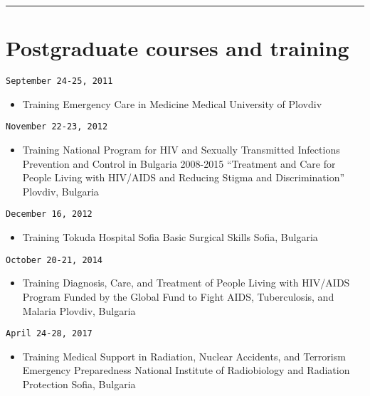 \documentclass[
  12pt,
  letterpaper,
  DIV=11,
  numbers=noendperiod]{scrartcl}
\providecommand{\tightlist}{%
  \setlength{\itemsep}{0pt}\setlength{\parskip}{0pt}}\usepackage{longtable,booktabs,array}
\begin{document}
\begin{center}\rule{0.5\linewidth}{0.5pt}\end{center}

\section{Postgraduate courses and
training}\label{postgraduate-courses-and-training}

\texttt{September\ 24-25,\ 2011}

\begin{itemize}
\tightlist
\item
  Training \textbar{} Emergency Care in Medicine \textbar{} Medical
  University of Plovdiv
\end{itemize}

\texttt{November\ 22-23,\ 2012}

\begin{itemize}
\tightlist
\item
  Training\textbar{} National Program for HIV and Sexually Transmitted
  Infections Prevention and Control in Bulgaria 2008-2015 \textbar{}
  ``Treatment and Care for People Living with HIV/AIDS and Reducing
  Stigma and Discrimination'' \textbar{} Plovdiv, Bulgaria
\end{itemize}

\texttt{December\ 16,\ 2012}

\begin{itemize}
\tightlist
\item
  Training\textbar{} Tokuda Hospital Sofia \textbar{} Basic Surgical
  Skills \textbar{} Sofia, Bulgaria
\end{itemize}

\texttt{October\ 20-21,\ 2014}

\begin{itemize}
\tightlist
\item
  Training \textbar{} Diagnosis, Care, and Treatment of People Living
  with HIV/AIDS \textbar{} Program Funded by the Global Fund to Fight
  AIDS, Tuberculosis, and Malaria \textbar{} Plovdiv, Bulgaria
\end{itemize}

\texttt{April\ 24-28,\ 2017}

\begin{itemize}
\tightlist
\item
  Training \textbar{} Medical Support in Radiation, Nuclear Accidents,
  and Terrorism Emergency Preparedness \textbar{} National Institute of
  Radiobiology and Radiation Protection \textbar{} Sofia, Bulgaria
\end{itemize}
\end{document}
